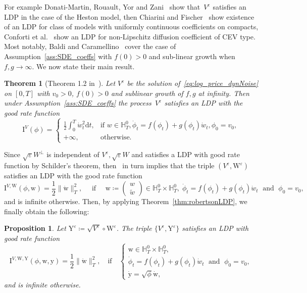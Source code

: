 \documentclass{amsart}[11pt]
\numberwithin{equation}{section}
\newtheorem{theorem}{Theorem}%
\numberwithin{theorem}{subsection}
\newtheorem{proposition}{Proposition}
\numberwithin{proposition}{subsection}
\numberwithin{definition}{subsection}
\numberwithin{lemma}{subsection}
\numberwithin{assumption}{subsection}
\newcommand{\HH}{\mathbb{H}}
\newcommand{\Wf}{\boldsymbol{\mathrm{W}}}
\newcommand{\Yf}{\boldsymbol{\mathrm{Y}}}
\newcommand{\Wp}{W^{\perp}}
\newcommand{\D}{\mathrm{d}}
\newcommand{\II}{\mathrm{I}}
\newcommand{\IIV}{\mathrm{I}^{V}}
\newcommand{\eps}{\varepsilon}
\newcommand{\seps}{\sqrt{\eps}}
\newcommand{\ww}{\boldsymbol{\mathrm{w}}}
\newcommand{\yy}{\boldsymbol{\mathrm{y}}}
\begin{document}
For example Donati-Martin, Rouault, Yor and Zani~\cite{Donati-Martin2004} show that~$V^{\eps}$ satisfies an LDP in the case of the Heston model, then Chiarini and Fischer~\cite{Chiarini2014} show existence of an LDP for class of models with uniformly continuous coefficients on compacts, Conforti et al.~\cite{conforti2015small} show an LDP for non-Lipschitz diffusion coefficient of CEV type. 
Most notably, Baldi and Caramellino~\cite{Baldi2011} cover the case of Assumption~\ref{ass:SDE_coeffs} with $f(0)>0$ and sub-linear growth when $f,g\rightarrow \infty$. We now state their main result.
\begin{theorem}[Theorem 1.2 in~\cite{Baldi2011}]
Let $V^{\eps}$ be the solution of~\eqref{eq:log_price_dynNoise} on $[0, T]$ with $v_0>0$, $f(0)>0$ and sublinear growth of $f,g$ at infinity. 
Then under Assumption~\ref{ass:SDE_coeffs} the process~$V^\eps$ satisfies an LDP with the good rate function
\[
\IIV(\phi)= \begin{cases}
\displaystyle \frac{1}{2} \int_{0}^{T} \dot{w}_t^2 \D t, 
& \text{if } w\in\HH^0_T, \dot{\phi}_t = f(\phi_t) + g(\phi_t)\dot{w}_t, \phi_0 = v_0, \\ 
+\infty, & \text{otherwise}.
\end{cases}
\]
\end{theorem}
Since $\seps \Wp$ is independent of $V^{\eps}, \seps W$ and satisfies a LDP with good rate function by Schilder's theorem, 
then~\cite[Exercise 4.2.7]{Dembo2010} in turn implies that the triple $(V^{\eps}, \Wf^\eps)$ satisfies an LDP with the good rate function
$$
\II^{V,\Wf}(\phi,\ww) =  
\frac{1}{2}\|\dot{\ww}\|_{T}^2,
\quad\text{ if }\quad
\ww \coloneqq \begin{pmatrix}
           w \\
           \widetilde{w}
         \end{pmatrix} \in \HH_T^0\times \HH_T^0,\; \dot{\phi}_t = f(\phi_t) + g(\phi_t)\dot{w}_t\; \text{ and } \; \phi_0 = v_0,
$$
and is infinite otherwise. 
Then, by applying Theorem~\ref{thm:robertsonLDP}, we finally obtain the following:
\begin{proposition} 
Let $\Yf^{\eps} \coloneqq \sqrt{V^\eps}\circ \Wf^\eps$.
The triple $\{V^{\eps}, \Yf^{\eps}\}$ satisfies an LDP with good rate function
\begin{equation*}
\II^{V,\Wf,\Yf}(\phi,\ww,\yy) = \frac{1}{2} \|\dot{\ww}\|_T^2,
\quad \text{if} \quad 
\left\{
 \begin{array}{l}
\displaystyle \ww \in \HH_T^0\times \HH_T^0,\\
\displaystyle \dot{\phi}_t = f(\phi_t) + g(\phi_{t})\dot{w}_t \; \text{ and } \;  \phi_0 = v_0, \\
\displaystyle \dot{\yy} = \sqrt{\phi}\dot{\ww},
 \end{array}
\right.
\end{equation*}
and is infinite otherwise.
\end{proposition}
\end{document}
